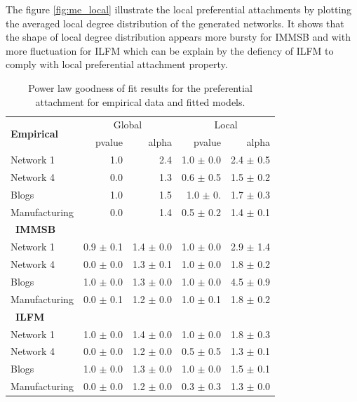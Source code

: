 The figure \ref{fig:me_local} illustrate the local preferential attachments by plotting the averaged local degree distribution of the generated networks. It shows that the shape of local degree distribution appears more bursty for IMMSB and with more fluctuation for ILFM which can be explain by the defiency of ILFM to comply with local preferential attachment property.


\begin{table}[t]
    \caption{Power law goodness of fit results for the preferential attachment for empirical data and fitted models.}
\centering
  \begin{tabular}{lrrrr}
      \multirow{2}{*}{\textbf{Empirical}}  &
      \multicolumn{2}{c}{Global} & \multicolumn{2}{c}{Local}\\
      \cmidrule(r){2-3} \cmidrule(l){4-5}
      &   pvalue &   alpha   & pvalue & alpha   \\
  	\hline
    Network 1     &    1.0 &   2.4 & 1.0 $\pm$ 0.0  &  2.4 $\pm$ 0.5  \\
    Network 4     &    0.0 &   1.3 & 0.6 $\pm$ 0.5  &  1.5 $\pm$ 0.2 \\
    Blogs         &    1.0 &   1.5 & 1.0 $\pm$ 0.   &  1.7 $\pm$ 0.3 \\
    Manufacturing &    0.0 &   1.4 & 0.5 $\pm$ 0.2  &  1.4 $\pm$ 0.1 \\
  	\hline

      \ \textbf{IMMSB} &&&& \\
  	\hline
    Network 1     & 0.9 \(\pm\) 0.1   & 1.4 \(\pm\) 0.0 & 1.0 \(\pm\) 0.0   & 2.9 \(\pm\) 1.4 \\
    Network 4     & 0.0 \(\pm\) 0.0   & 1.3 \(\pm\) 0.1 & 1.0 \(\pm\) 0.0   & 1.8 \(\pm\) 0.2 \\
    Blogs         & 1.0 \(\pm\) 0.0   & 1.3 \(\pm\) 0.0 & 1.0 \(\pm\) 0.0   & 4.5 \(\pm\) 0.9 \\
    Manufacturing & 0.0 \(\pm\) 0.1   & 1.2 \(\pm\) 0.0 & 1.0 \(\pm\) 0.1   & 1.8 \(\pm\) 0.2 \\
  	\hline

      \ \textbf{ILFM} &&&& \\
  	\hline
    Network 1     & 1.0 \(\pm\) 0.0 & 1.4 \(\pm\) 0.0 & 1.0 \(\pm\) 0.0 & 1.8 \(\pm\) 0.3 \\
    Network 4     & 0.0 \(\pm\) 0.0 & 1.2 \(\pm\) 0.0 & 0.5 \(\pm\) 0.5 & 1.3 \(\pm\) 0.1 \\
    Blogs         & 1.0 \(\pm\) 0.0 & 1.3 \(\pm\) 0.0 & 1.0 \(\pm\) 0.0 & 1.5 \(\pm\) 0.1 \\
    Manufacturing & 0.0 \(\pm\) 0.0 & 1.2 \(\pm\) 0.0 & 0.3 \(\pm\) 0.3 & 1.3 \(\pm\) 0.0 \\
  	\hline
  \end{tabular}
\label{table:me_gofit}
\end{table}

